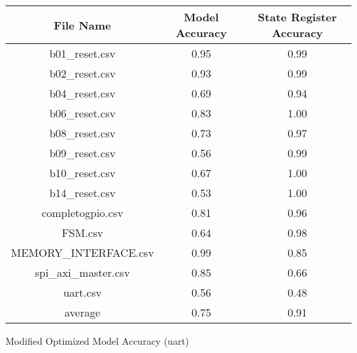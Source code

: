 \bigskip\begin{tabular}{|c|c|c|}
    \hline
    File Name & Model Accuracy & State Register Accuracy\\
    \hline
    \hline
    b01\_reset.csv & 0.95 & 0.99\\
    \hline
    b02\_reset.csv & 0.93 & 0.99\\
    \hline
    b04\_reset.csv & 0.69 & 0.94\\
    \hline
    b06\_reset.csv & 0.83 & 1.00\\
    \hline
    b08\_reset.csv & 0.73 & 0.97\\
    \hline
    b09\_reset.csv & 0.56 & 0.99\\
    \hline
    b10\_reset.csv & 0.67 & 1.00\\
    \hline
    b14\_reset.csv & 0.53 & 1.00\\
    \hline
    completogpio.csv & 0.81 & 0.96\\
    \hline
    FSM.csv & 0.64 & 0.98\\
    \hline
    MEMORY\_INTERFACE.csv & 0.99 & 0.85\\
    \hline
    spi\_axi\_master.csv & 0.85 & 0.66\\
    \hline
    uart.csv & 0.56 & 0.48\\
    \hline
    \hline
    average & 0.75 & 0.91\\
    \hline
\end{tabular}
\caption{Modified Optimized Model Accuracy (uart)}
\label{tab:Modified Optimized Model Accuracy (uart)}